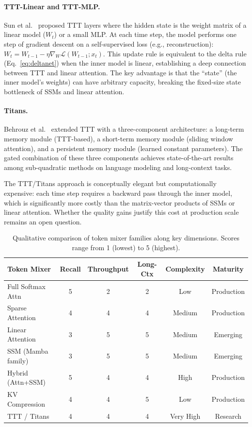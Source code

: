 \paragraph{TTT-Linear and TTT-MLP.}
Sun et al.~\cite{sun2024learning} proposed TTT layers where the hidden state is the weight matrix of a linear model ($W_t$) or a small MLP. At each time step, the model performs one step of gradient descent on a self-supervised loss (e.g., reconstruction): $W_t = W_{t-1} - \eta \nabla_W \mathcal{L}(W_{t-1}; x_t)$. This update rule is equivalent to the delta rule (Eq.~\ref{eq:deltanet}) when the inner model is linear, establishing a deep connection between TTT and linear attention. The key advantage is that the ``state'' (the inner model's weights) can have arbitrary capacity, breaking the fixed-size state bottleneck of SSMs and linear attention.

\paragraph{Titans.}
Behrouz et al.~\cite{behrouz2024titans} extended TTT with a three-component architecture: a long-term memory module (TTT-based), a short-term memory module (sliding window attention), and a persistent memory module (learned constant parameters). The gated combination of these three components achieves state-of-the-art results among sub-quadratic methods on language modeling and long-context tasks.

The TTT/Titans approach is conceptually elegant but computationally expensive: each time step requires a backward pass through the inner model, which is significantly more costly than the matrix-vector products of SSMs or linear attention. Whether the quality gains justify this cost at production scale remains an open question.

\begin{table}[t]
\centering
\caption{Qualitative comparison of token mixer families along key dimensions. Scores range from 1 (lowest) to 5 (highest).}
\label{tab:token-mixer-overview}
\small
\begin{tabular}{lccccc}
\toprule
\textbf{Token Mixer} & \textbf{Recall} & \textbf{Throughput} & \textbf{Long-Ctx} & \textbf{Complexity} & \textbf{Maturity} \\
\midrule
Full Softmax Attn    & 5 & 2 & 2 & Low       & Production \\
Sparse Attention     & 4 & 4 & 4 & Medium    & Production \\
Linear Attention     & 3 & 5 & 5 & Medium    & Emerging   \\
SSM (Mamba family)   & 3 & 5 & 5 & Medium    & Emerging   \\
Hybrid (Attn+SSM)    & 5 & 4 & 4 & High      & Production \\
KV Compression       & 4 & 4 & 5 & Low       & Production \\
TTT / Titans         & 4 & 4 & 4 & Very High & Research   \\
\bottomrule
\end{tabular}
\end{table}
